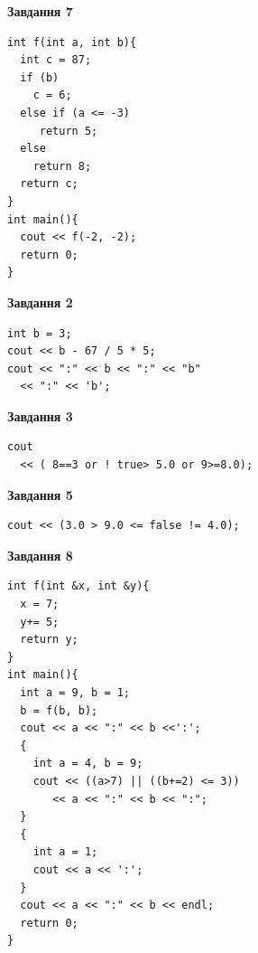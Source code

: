 \documentclass[12pt, ukrainian]{article}
\begin{document}
{\begin {large}
\begin{minipage}[t]{7.0cm}
\begin{center}
\textbf{Завдання 7}
\end{center}
\vspace{-8mm}

\begin{verbatim}
int f(int a, int b){
  int c = 87;
  if (b)
    c = 6;
  else if (a <= -3)
     return 5;
  else
    return 8;
  return c;
}
int main(){
  cout << f(-2, -2);
  return 0;
}
\end{verbatim}

\end{minipage}
\vline \hspace{1mm}
\begin{minipage}[t]{11.0cm}

\begin{center}
\textbf{Завдання 2}
\end{center}
\vspace{-8mm}

\begin{verbatim}
int b = 3;
cout << b - 67 / 5 * 5;
cout << ":" << b << ":" << "b" 
  << ":" << 'b';
\end{verbatim}



\begin{center}
\textbf{Завдання 3}
\end{center}
\vspace{-8mm}

\begin{verbatim}
cout 
  << ( 8==3 or ! true> 5.0 or 9>=8.0);
\end{verbatim}



\begin{center}
\textbf{Завдання 5}
\end{center}
\vspace{-8mm}

\begin{verbatim}
cout << (3.0 > 9.0 <= false != 4.0);
\end{verbatim}



\begin{center}
\textbf{Завдання 8}
\end{center}
\vspace{-8mm}

\begin{verbatim}
int f(int &x, int &y){
  x = 7;
  y+= 5;
  return y;
}
int main(){
  int a = 9, b = 1;
  b = f(b, b);
  cout << a << ":" << b <<':';
  {
    int a = 4, b = 9;
    cout << ((a>7) || ((b+=2) <= 3))
       << a << ":" << b << ":";
  }
  {
    int a = 1;
    cout << a << ':';
  }
  cout << a << ":" << b << endl;
  return 0;
}
\end{verbatim}


\end{minipage}
\end{large}}
\end{document}
